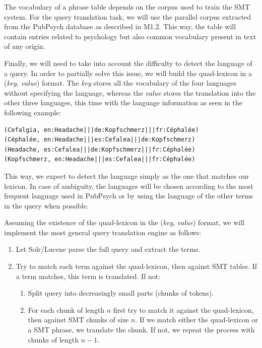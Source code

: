 \documentclass[a4paper,11pt]{article}
\begin{document}
The vocabulary of a phrase table depends on the corpus used to train the SMT system. For the query translation task, we will use the parallel corpus extracted from the PubPsych database as described in M1.2. This way, the table will contain entries related to psychology but also common vocabulary present in text of any origin.

Finally, we will need to take into account the difficulty to detect the language of a query. In order to partially solve this issue, we will build the quad-lexicon in a (\emph{key}, \emph{value}) format. The \emph{key} stores all the vocabulary of the four languages without specifying the language, whereas the \emph{value} stores the translation into the other three languages, this time with the language information as seen in the following example:
{\small
\begin{verbatim}
(Cefalgia, en:Headache|||de:Kopfschmerz|||fr:Céphalée)
(Céphalée, en:Headache|||es:Cefalea|||de:Kopfschmerz)
(Headache, es:Cefalea|||de:Kopfschmerz|||fr:Céphalée)
(Kopfschmerz, en:Headache|||es:Cefalea|||fr:Céphalée)
\end{verbatim}
}

\noindent This way, we expect to detect the language simply as the one that matches our lexicon. In case of ambiguity, the languages will be chosen according to the most frequent language used in PubPsych or by using the language of the other terms in the query when possible.

Assuming the existence of the quad-lexicon in the (\emph{key}, \emph{value}) format, we will implement the most general query translation engine as follows:

\begin{enumerate}
 \item Let Solr/Lucene parse the full query and extract the terms.
 \item Try to match each term against the quad-lexicon, then against SMT tables. If a term matches, this term is translated. If not:
 \begin{enumerate}[label*=\arabic*.]
 \item Split query into decreasingly small parts (chunks of tokens).
 \item For each chunk of length $n$ first try to match it against the quad-lexicon, then against SMT chunks of size $n$. If we match either the quad-lexicon or a SMT phrase, we translate the chunk. If not, we repeat the process with chunks of length $n-1$.
 \end{enumerate}
\end{enumerate}
\end{document}
